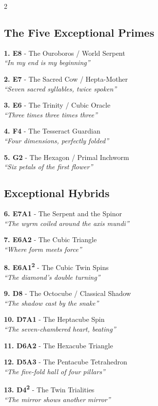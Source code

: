 \documentclass[11pt]{article}
\begin{document}
\small
\begin{multicols}{2}

\subsection*{The Five Exceptional Primes}

\textbf{1. E8} - The Ouroboros / World Serpent\\
\textit{``In my end is my beginning''}

\textbf{2. E7} - The Sacred Cow / Hepta-Mother\\
\textit{``Seven sacred syllables, twice spoken''}

\textbf{3. E6} - The Trinity / Cubic Oracle\\
\textit{``Three times three times three''}

\textbf{4. F4} - The Tesseract Guardian\\
\textit{``Four dimensions, perfectly folded''}

\textbf{5. G2} - The Hexagon / Primal Inchworm\\
\textit{``Six petals of the first flower''}

\subsection*{Exceptional Hybrids}

\textbf{6. E7A1} - The Serpent and the Spinor\\
\textit{``The wyrm coiled around the axis mundi''}

\textbf{7. E6A2} - The Cubic Triangle\\
\textit{``Where form meets force''}

\textbf{8. E6A1\textsuperscript{2}} - The Cubic Twin Spins\\
\textit{``The diamond's double turning''}

\textbf{9. D8} - The Octocube / Classical Shadow\\
\textit{``The shadow cast by the snake''}

\textbf{10. D7A1} - The Heptacube Spin\\
\textit{``The seven-chambered heart, beating''}

\textbf{11. D6A2} - The Hexacube Triangle

\textbf{12. D5A3} - The Pentacube Tetrahedron\\
\textit{``The five-fold hall of four pillars''}

\textbf{13. D4\textsuperscript{2}} - The Twin Trialities\\
\textit{``The mirror shows another mirror''}


\end{multicols}
\end{document}
